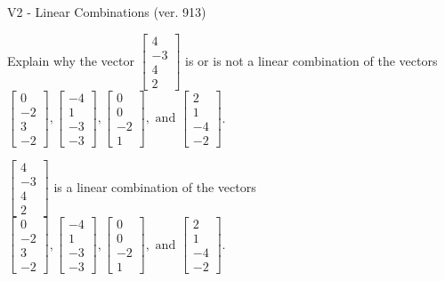 \begin{exercise}
  \begin{exerciseTitle}V2 - Linear Combinations (ver. 913)\end{exerciseTitle}
  \begin{exerciseStatement}
    Explain why the vector \(\left[\begin{array}{c}
4 \\
-3 \\
4 \\
2
\end{array}\right]\)  is or is not a linear 
	combination of the vectors \(\left[\begin{array}{c}
0 \\
-2 \\
3 \\
-2
\end{array}\right] , \left[\begin{array}{c}
-4 \\
1 \\
-3 \\
-3
\end{array}\right] , \left[\begin{array}{c}
0 \\
0 \\
-2 \\
1
\end{array}\right] , \text{ and } \left[\begin{array}{c}
2 \\
1 \\
-4 \\
-2
\end{array}\right]\).
	


  \end{exerciseStatement}
  \begin{exerciseAnswer}
   \(\left[\begin{array}{c}
4 \\
-3 \\
4 \\
2
\end{array}\right]\) 
  	 is  
	a linear combination of the vectors \(\left[\begin{array}{c}
0 \\
-2 \\
3 \\
-2
\end{array}\right] , \left[\begin{array}{c}
-4 \\
1 \\
-3 \\
-3
\end{array}\right] , \left[\begin{array}{c}
0 \\
0 \\
-2 \\
1
\end{array}\right] , \text{ and } \left[\begin{array}{c}
2 \\
1 \\
-4 \\
-2
\end{array}\right]\).


\end{exerciseAnswer}
\end{exercise}
